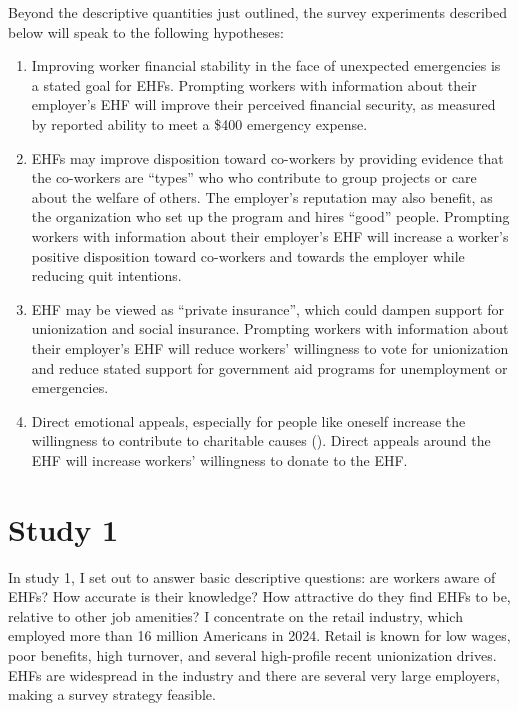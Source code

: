 \documentclass[
  11pt,
  oneside]{article}
\providecommand{\tightlist}{%
  \setlength{\itemsep}{0pt}\setlength{\parskip}{0pt}}
\begin{document}
Beyond the descriptive quantities just outlined, the survey experiments described below will speak to the following hypotheses:

\begin{enumerate}
\def\labelenumi{\arabic{enumi}.}
\tightlist
\item
  Improving worker financial stability in the face of unexpected emergencies is a stated goal for EHFs. Prompting workers with information about their employer's EHF will improve their perceived financial security, as measured by reported ability to meet a \$400 emergency expense.
\item
  EHFs may improve disposition toward co-workers by providing evidence that the co-workers are ``types'' who who contribute to group projects or care about the welfare of others. The employer's reputation may also benefit, as the organization who set up the program and hires ``good'' people. Prompting workers with information about their employer's EHF will increase a worker's positive disposition toward co-workers and towards the employer while reducing quit intentions.
\item
  EHF may be viewed as ``private insurance'', which could dampen support for unionization and social insurance. Prompting workers with information about their employer's EHF will reduce workers' willingness to vote for unionization and reduce stated support for government aid programs for unemployment or emergencies.
\item
  Direct emotional appeals, especially for people like oneself increase the willingness to contribute to charitable causes (). Direct appeals around the EHF will increase workers' willingness to donate to the EHF.
\end{enumerate}

\section{Study 1}\label{study-1}

In study 1, I set out to answer basic descriptive questions: are workers aware of EHFs? How accurate is their knowledge? How attractive do they find EHFs to be, relative to other job amenities? I concentrate on the retail industry, which employed more than 16 million Americans in 2024. Retail is known for low wages, poor benefits, high turnover, and several high-profile recent unionization drives. EHFs are widespread in the industry and there are several very large employers, making a survey strategy feasible.
\end{document}
